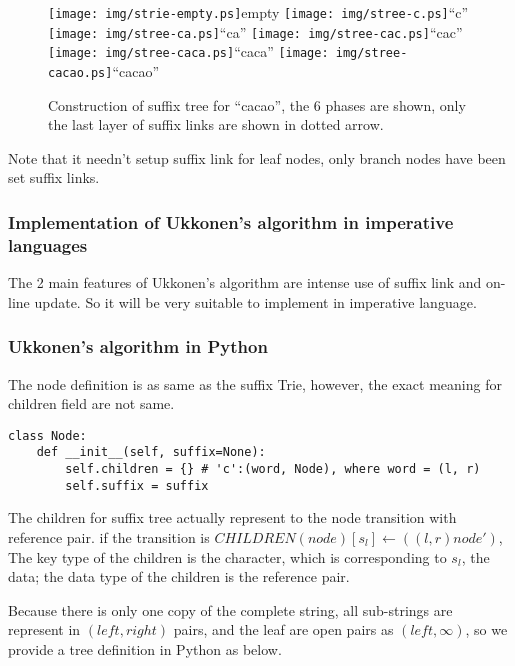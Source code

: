 \documentclass{article}
\begin{document}
\begin{figure}[htbp]
   \begin{center}
     \texttt{[image: img/strie-empty.ps]}empty
     \texttt{[image: img/stree-c.ps]}``c''
     \texttt{[image: img/stree-ca.ps]}``ca''
     \texttt{[image: img/stree-cac.ps]}``cac'' \newline
     \texttt{[image: img/stree-caca.ps]}``caca''
     \texttt{[image: img/stree-cacao.ps]}``cacao''
     \caption{Construction of suffix tree for ``cacao'', the 6 phases are shown, only the last layer of suffix links are shown in dotted arrow.}
     \label{fig:cons-stree-cacao}
   \end{center}
\end{figure}

Note that it needn't setup suffix link for leaf nodes, only branch nodes
have been set suffix links.

\subsubsection{Implementation of Ukkonen's algorithm in imperative languages}
The 2 main features of Ukkonen's algorithm are intense use of suffix link and
on-line update. So it will be very suitable to implement in imperative language.

\subsubsection*{Ukkonen's algorithm in Python}
The node definition is as same as the suffix Trie, however, the exact meaning
for children field are not same.

\lstset{language=Python}
\begin{lstlisting}
class Node:
    def __init__(self, suffix=None):
        self.children = {} # 'c':(word, Node), where word = (l, r)
        self.suffix = suffix
\end{lstlisting}

The children for suffix tree actually represent to the node transition
with reference pair. if the transition is 
$CHILDREN(node)[s_l] \leftarrow ((l, r) node')$, 
The key type of the children is the character, which is corresponding 
to $s_l$, the data; the data type of the children is the reference pair.

Because there is only one copy of the complete string, all sub-strings
are represent in $(left, right)$ pairs, and the leaf are open pairs
as $(left, \infty)$, so we provide a tree definition in Python as below.
\end{document}
